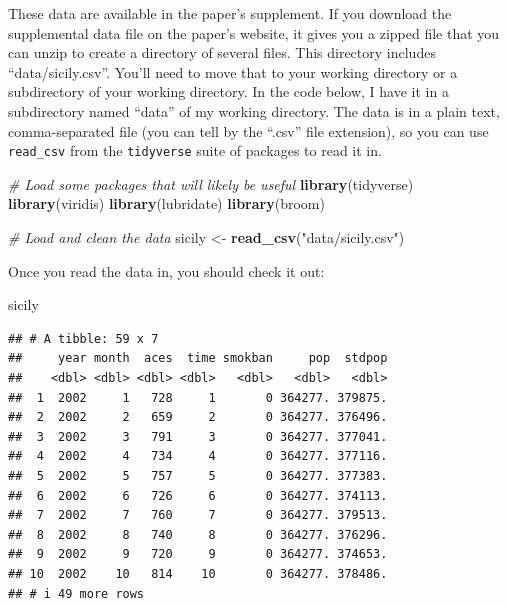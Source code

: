 \documentclass[
]{book}
\newenvironment{Shaded}{\begin{snugshade}}{\end{snugshade}}
\newcommand{\CommentTok}[1]{\textcolor[rgb]{0.56,0.35,0.01}{\textit{#1}}}
\newcommand{\FunctionTok}[1]{\textcolor[rgb]{0.13,0.29,0.53}{\textbf{#1}}}
\newcommand{\NormalTok}[1]{#1}
\newcommand{\OtherTok}[1]{\textcolor[rgb]{0.56,0.35,0.01}{#1}}
\newcommand{\StringTok}[1]{\textcolor[rgb]{0.31,0.60,0.02}{#1}}
\begin{document}
These data are available in the paper's supplement. If you download the supplemental data file on the paper's website, it gives you a zipped file that you can unzip to create a directory of several files. This directory includes ``data/sicily.csv''. You'll need to move that to your working directory or a subdirectory of your working directory. In the code below, I have it in a subdirectory named ``data'' of my working directory. The data is in a plain text, comma-separated file (you can tell by the ``.csv'' file extension), so you can use \texttt{read\_csv} from the \texttt{tidyverse} suite of packages to read it in.

\begin{Shaded}
\begin{Highlighting}[]
\CommentTok{\# Load some packages that will likely be useful}
\FunctionTok{library}\NormalTok{(tidyverse)}
\FunctionTok{library}\NormalTok{(viridis)}
\FunctionTok{library}\NormalTok{(lubridate)}
\FunctionTok{library}\NormalTok{(broom)}

\CommentTok{\# Load and clean the data}
\NormalTok{sicily }\OtherTok{\textless{}{-}} \FunctionTok{read\_csv}\NormalTok{(}\StringTok{"data/sicily.csv"}\NormalTok{)}
\end{Highlighting}
\end{Shaded}

Once you read the data in, you should check it out:

\begin{Shaded}
\begin{Highlighting}[]
\NormalTok{sicily}
\end{Highlighting}
\end{Shaded}

\begin{verbatim}
## # A tibble: 59 x 7
##     year month  aces  time smokban     pop  stdpop
##    <dbl> <dbl> <dbl> <dbl>   <dbl>   <dbl>   <dbl>
##  1  2002     1   728     1       0 364277. 379875.
##  2  2002     2   659     2       0 364277. 376496.
##  3  2002     3   791     3       0 364277. 377041.
##  4  2002     4   734     4       0 364277. 377116.
##  5  2002     5   757     5       0 364277. 377383.
##  6  2002     6   726     6       0 364277. 374113.
##  7  2002     7   760     7       0 364277. 379513.
##  8  2002     8   740     8       0 364277. 376296.
##  9  2002     9   720     9       0 364277. 374653.
## 10  2002    10   814    10       0 364277. 378486.
## # i 49 more rows
\end{verbatim}
\end{document}
